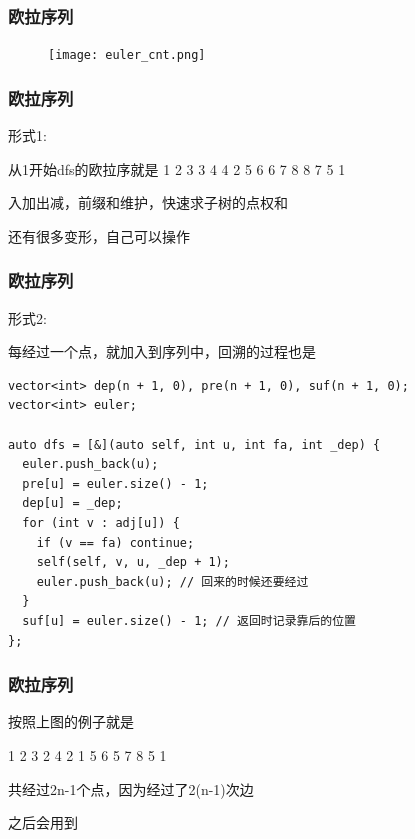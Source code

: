 \documentclass{beamer}
\begin{document}
  \begin{frame}[fragile]
    \frametitle{欧拉序列}
    \begin{figure}[!htb] %
      \texttt{[image: euler\_cnt.png]} %
    \end{figure}
  \end{frame}

  \begin{frame}
    \frametitle{欧拉序列}
    形式1:

    \vspace*{1\baselineskip}
    
    从1开始dfs的欧拉序就是 1 2 3 3 4 4 2 5 6 6 7 8 8 7 5 1 
    
    \vspace*{1\baselineskip}
    
    入加出减，前缀和维护，快速求子树的点权和
    
    \pause
    \vspace*{1\baselineskip}

    还有很多变形，自己可以操\mars 作
  \end{frame}

  \begin{frame}[fragile]
    \frametitle{欧拉序列}
    形式2:

    每经过一个点，就加入到序列中，回溯的过程也是

    \begin{lstlisting}
vector<int> dep(n + 1, 0), pre(n + 1, 0), suf(n + 1, 0);
vector<int> euler;

auto dfs = [&](auto self, int u, int fa, int _dep) {
  euler.push_back(u);
  pre[u] = euler.size() - 1;
  dep[u] = _dep;
  for (int v : adj[u]) {
    if (v == fa) continue;
    self(self, v, u, _dep + 1);
    euler.push_back(u); // 回来的时候还要经过
  }
  suf[u] = euler.size() - 1; // 返回时记录靠后的位置
};
    \end{lstlisting}
  \end{frame}

  \begin{frame}
    \frametitle{欧拉序列}
    按照上图的例子就是

    1 2 3 2 4 2 1 5 6 5 7 8 5 1

    \vspace*{1\baselineskip}

    共经过2n-1个点，因为经过了2(n-1)次边

    \vspace*{1\baselineskip}

    \pause

    之后会用到
  \end{frame}
\end{document}
